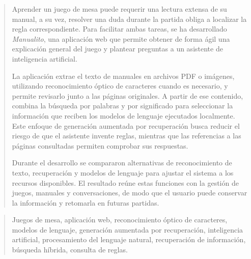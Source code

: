 \documentclass[a4paper,12pt,oneside,openleft]{memoir}
\begin{document}
\renewcommand*\abstractname{Resumen}
\begin{abstract}
Aprender un juego de mesa puede requerir una lectura extensa de su manual,
a su vez, resolver una duda durante la partida obliga a localizar la
regla correspondiente. Para facilitar ambas tareas, se ha desarrollado
\textit{Manualito}, una aplicación web que permite obtener de forma ágil una
explicación general del juego y plantear preguntas a un asistente de
inteligencia artificial.

La aplicación extrae el texto de manuales en archivos \acs{PDF} o imágenes,
utilizando reconocimiento óptico de caracteres cuando es necesario, y
permite revisarlo junto a las páginas originales. A partir de ese contenido,
combina la búsqueda por palabras y por significado para seleccionar la
información que reciben los modelos de lenguaje ejecutados localmente.
Este enfoque de generación aumentada por recuperación busca reducir el
riesgo de que el asistente invente reglas, mientras que las referencias a
las páginas consultadas permiten comprobar sus respuestas.

Durante el desarrollo se compararon alternativas de reconocimiento de
texto, recuperación y modelos de lenguaje para ajustar el sistema a los
recursos disponibles. El resultado reúne estas funciones con la gestión de
juegos, manuales y conversaciones, de modo que el usuario puede conservar
la información y retomarla en futuras partidas.
\end{abstract}

\renewcommand*\abstractname{Descriptores}
\begin{abstract}
Juegos de mesa, aplicación web, reconocimiento óptico de caracteres, modelos
de lenguaje, generación aumentada por recuperación, inteligencia artificial,
procesamiento del lenguaje natural, recuperación de información, búsqueda
híbrida, consulta de reglas.
\end{abstract}

\clearpage
\end{document}
